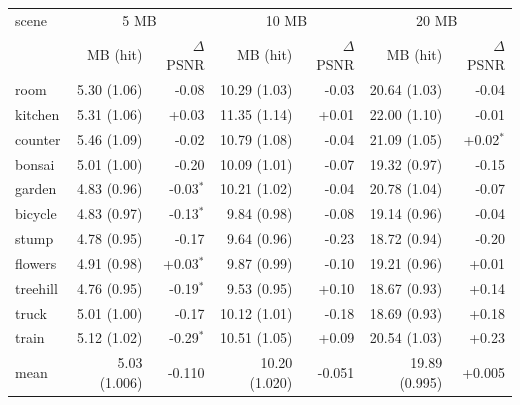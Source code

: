 \begin{tabular}{@{}lrrrrrr@{}}
\toprule
scene & \multicolumn{2}{c}{5 MB} & \multicolumn{2}{c}{10 MB} & \multicolumn{2}{c}{20 MB} \\
 & MB (hit) & $\Delta$PSNR & MB (hit) & $\Delta$PSNR & MB (hit) & $\Delta$PSNR \\
\midrule
room & 5.30 (1.06) & -0.08 & 10.29 (1.03) & -0.03 & 20.64 (1.03) & -0.04 \\
kitchen & 5.31 (1.06) & +0.03 & 11.35 (1.14) & +0.01 & 22.00 (1.10) & -0.01 \\
counter & 5.46 (1.09) & -0.02 & 10.79 (1.08) & -0.04 & 21.09 (1.05) & +0.02$^*$ \\
bonsai & 5.01 (1.00) & -0.20 & 10.09 (1.01) & -0.07 & 19.32 (0.97) & -0.15 \\
garden & 4.83 (0.96) & -0.03$^*$ & 10.21 (1.02) & -0.04 & 20.78 (1.04) & -0.07 \\
bicycle & 4.83 (0.97) & -0.13$^*$ & 9.84 (0.98) & -0.08 & 19.14 (0.96) & -0.04 \\
stump & 4.78 (0.95) & -0.17 & 9.64 (0.96) & -0.23 & 18.72 (0.94) & -0.20 \\
flowers & 4.91 (0.98) & +0.03$^*$ & 9.87 (0.99) & -0.10 & 19.21 (0.96) & +0.01 \\
treehill & 4.76 (0.95) & -0.19$^*$ & 9.53 (0.95) & +0.10 & 18.67 (0.93) & +0.14 \\
truck & 5.01 (1.00) & -0.17 & 10.12 (1.01) & -0.18 & 18.69 (0.93) & +0.18 \\
train & 5.12 (1.02) & -0.29$^*$ & 10.51 (1.05) & +0.09 & 20.54 (1.03) & +0.23 \\
\midrule
mean & 5.03 (1.006) & -0.110 & 10.20 (1.020) & -0.051 & 19.89 (0.995) & +0.005 \\
\bottomrule
\end{tabular}
